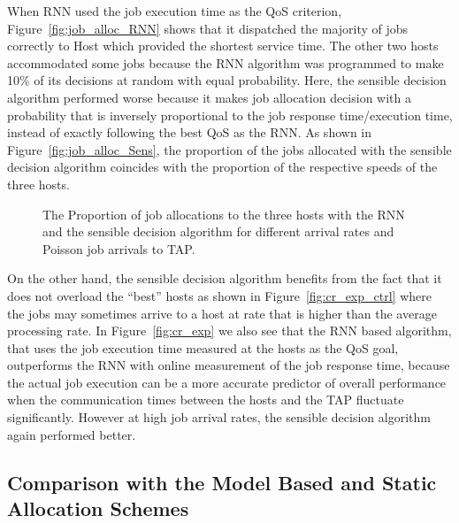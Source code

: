 \documentclass[journal]{IEEEtran}
\begin{document}
When RNN used the job execution time as the QoS criterion, Figure~\ref{fig:job_alloc_RNN} shows that it dispatched the majority of jobs correctly to Host   which provided the shortest service time. The other two hosts accommodated some jobs because the RNN algorithm was programmed to make 10\% of its decisions at random with equal probability. Here, the sensible decision algorithm performed worse because it makes job allocation decision with a probability that is inversely proportional to the job response time/execution time, instead of exactly following the best QoS as the RNN. As shown in Figure~\ref{fig:job_alloc_Sens}, the proportion of the jobs allocated with the sensible decision algorithm coincides with the proportion of the respective speeds of the three hosts.


		
	\begin{figure}[ht]
		\centering
			 
     \caption{The Proportion of job allocations to the three hosts with the RNN and the sensible decision algorithm for different arrival rates and Poisson job arrivals to TAP.}
   \end{figure}
		
On the other hand, the sensible decision algorithm benefits from the fact that it does not overload the ``best'' hosts as shown in Figure~\ref{fig:cr_exp_ctrl} where the jobs may sometimes arrive to a host at rate that is higher than the average processing rate.  In Figure~\ref{fig:cr_exp} we also see that the RNN based algorithm, that uses the job execution time measured at the hosts as the QoS goal,  outperforms the RNN with online measurement of the job response time,  because the actual job execution can be a more accurate predictor of overall performance when the communication times between the hosts and the TAP
fluctuate significantly. However at high job arrival rates,  the sensible decision algorithm again performed better. 

\subsection{Comparison with the Model Based and Static Allocation Schemes}
\label{performanceevaluationofallschemes}
\end{document}
